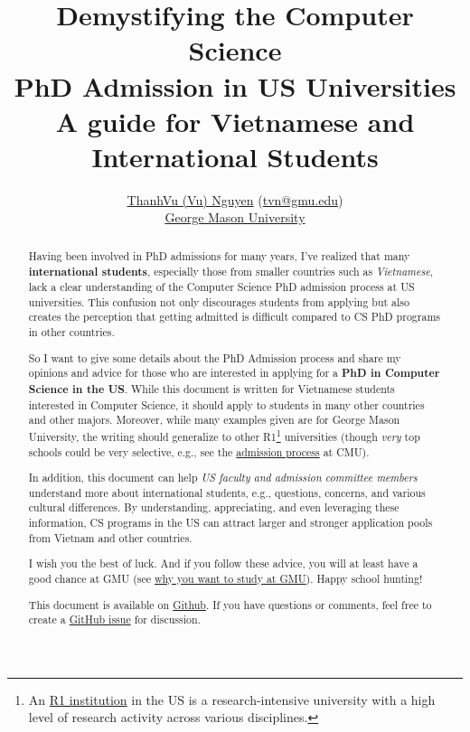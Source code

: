 \documentclass[11pt]{article}
\title{\vspace{-1in} Demystifying the Computer Science \\PhD Admission in US Universities\\{\large A guide for Vietnamese and International Students}}
\author{\small \href{https://nguyenthanhvuh.github.io}{ThanhVu (Vu) Nguyen} (\href{mailto:tvn@gmu.edu}{tvn@gmu.edu})\\
 \href{https://cs.gmu.edu}{George Mason University}}
\begin{document}
\maketitle

\begin{abstract}
Having been involved in PhD admissions for many years, I've
realized that many \textbf{international students}, especially those from smaller countries such as \emph{Vietnamese}, lack a clear understanding of
the Computer Science PhD admission process at US universities. This confusion not only
discourages students from applying but also creates the perception that
getting admitted is difficult compared to CS PhD programs in other countries.

So I want to give some details about the PhD Admission process and share my opinions and advice for those who are interested in applying for a \textbf{PhD in Computer Science in the US}.
While this document is written for Vietnamese students interested in Computer Science, it should apply to students in many other countries and other majors.
Moreover, while many examples given are for George Mason University, the writing should generalize to other R1\footnote{An \href{https://en.wikipedia.org/wiki/List_of_research_universities_in_the_United_States}{R1 institution} in the US is a research-intensive university with a high level of research activity across various disciplines.} universities  (though \emph{very} top schools could be very selective, e.g., see the \href{https://da-data.blogspot.com/2015/03/reflecting-on-cs-graduate-admissions.html}{admission process} at CMU).

In addition, this document can help \emph{US faculty and admission committee members} understand more about international students, e.g., questions, concerns, and various cultural differences.  By understanding, appreciating, and even leveraging these information, CS programs in the US can attract larger and stronger application pools from Vietnam and other countries.

I wish you the best of luck. And if you follow these advice,
you will at least have a good chance at GMU (see
\href{https://github.com/dynaroars/dynaroars.github.io/wiki/About-GMU}{why
you want to study at GMU}). Happy school hunting!

This document is available on \href{https://github.com/nguyenthanhvuh/phd-cs-us}{Github}. If you have questions or comments, feel free to create a \href{https://github.com/nguyenthanhvuh/phd-cs-us/issues}{GitHub issue} for discussion.
\end{abstract}
\end{document}
